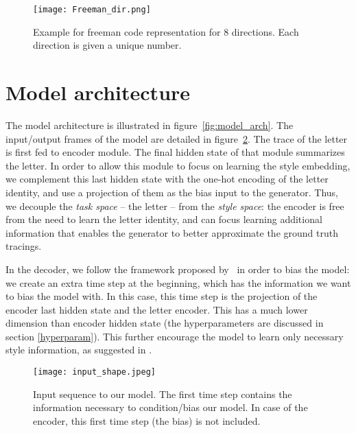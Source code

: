 \documentclass[conference]{IEEEtran}
\begin{document}
\begin{figure}[htbp!]
\centering
\texttt{[image: Freeman\_dir.png]}
\caption{Example for freeman code representation for 8 directions. Each direction is given a unique number.}
\label{fig:freeman_dir}
\end{figure}

\section{Model architecture}
 \par The model architecture is illustrated in figure~\ref{fig:model_arch}. The input/output frames of the model are detailed in figure~\ref{fig:input_shape}. The trace of the letter is first fed to encoder module. The final hidden state of that module summarizes the letter. In order to allow this module to focus on learning the style embedding, we complement this last hidden state with the one-hot encoding of the letter identity, and use a projection of them as the bias input to the generator. Thus, we decouple the \textit{task space} -- the letter -- from the \textit{style space}: the encoder is free from the need to learn the letter identity, and can focus learning additional information that enables the generator to better approximate the ground truth tracings.
\par In the decoder, we follow the framework proposed by~\cite{vinyals2015show} in order to bias the model: we create an extra time step at the beginning, which has the information we want to bias the model with. In this case, this time step is the projection of the encoder last hidden state and the letter encoder. This has a much lower dimension than encoder hidden state (the hyperparameters are discussed in section \ref{hyperparam}). This further encourage the model to learn only necessary style information, as suggested in \cite{DBLP:journals/corr/abs-1803-09047}.

\begin{figure}[htbp!]
\centering
\texttt{[image: input\_shape.jpeg]}
\caption{Input sequence to our model. The first time step contains the information necessary to condition/bias our model. In case of the encoder, this first time step (the bias) is not included.}
\label{fig:input_shape}
\end{figure}
\end{document}
